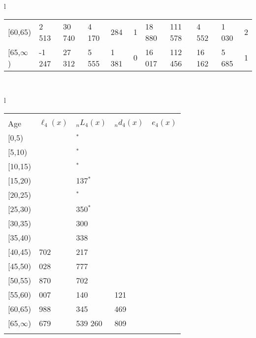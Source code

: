 \documentclass[
]{article}
\begin{document}
\begin{table}
\begin{tabular}[t]{l}
\begin{tabular}
{}[60,65) & 2 513 & 30 740 & 4 170 & 284 & 1 & 18 880 & 111 578 & 4 552 & 1 030 & 2\\
{}[65,$\infty$) & -1 247 & 27 312 & 5 555 & 1 381 & 0 & 16 017 & 112 456 & 16 162 & 5 685 & 1\\
\end{tabular}\\
\end{tabular}
\centering
\begin{tabular}[t]{l}
\hline
\begin{tabular}{>{\raggedright\arraybackslash}p{.43in}>{\raggedleft\arraybackslash}p{1.3in}>{\raggedleft\arraybackslash}p{1.3in}>{\raggedleft\arraybackslash}p{1.3in}>{\raggedleft\arraybackslash}p{1.3in}}
\toprule
\multicolumn{1}{c}{ } & \multicolumn{4}{c}{(4) Lost both} \\
\cmidrule(l{3pt}r{3pt}){2-5}
Age & $\ell_{4}(x)$ & ${}_nL_{4}(x)$ & ${}_nd_{4}(x)$ & $e_{4}(x)$\\
\midrule
{}[0,5) & 0 & 0$^{*}$ & 0 & 22\\
{}[5,10) & 0 & 755$^{*}$ & 0 & 22\\
{}[10,15) & 254 & 0$^{*}$ & 0 & 22\\
{}[15,20) & 254 & 1 137$^{*}$ & 0 & 22\\
{}[20,25) & 254 & 948$^{*}$ & 1 & 22\\
\addlinespace
{}[25,30) & 253 & 2 350$^{*}$ & 2 & 22\\
{}[30,35) & 405 & 8 300 & 9 & 22\\
{}[35,40) & 396 & 12 338 & 18 & 22\\
{}[40,45) & 1 702 & 26 217 & 51 & 22\\
{}[45,50) & 4 028 & 46 777 & 131 & 22\\
\addlinespace
{}[50,55) & 7 870 & 111 702 & 463 & 22\\
{}[55,60) & 16 007 & 179 140 & 1 121 & 21\\
{}[60,65) & 24 988 & 267 345 & 2 469 & 20\\
{}[65,$\infty$) & 31 679 & 1 539 260 & 77 809 & 18\\
\bottomrule
\multicolumn{5}{l}{\rule{0pt}{1em}\textsuperscript{*} Based on an estimated from SIPP with less than 10 respondents in the numerator.}\\
\end{tabular}\\
\end{tabular}
\end{table}
\end{document}
